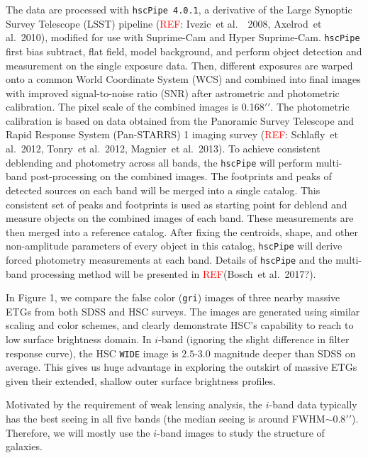 \documentclass[preprint]{aastex}
\def\arcsec{{\prime\prime}}
\def\etal{{\ et al.~}}
\newcommand{\addref}{{\textcolor{red}{REF}}}
\begin{document}
\begin{CJK*}{UTF8}{gbsn}
    The data are processed with \texttt{hscPipe 4.0.1}, a derivative of the Large Synoptic
    Survey Telescope (LSST) pipeline (\addref: Ivezic\etal~2008, Axelrod\etal 2010),
    modified for use with Suprime-Cam and Hyper Suprime-Cam.  
    \texttt{hscPipe} first bias subtract, flat field, model background, and perform object
    detection and measurement on the single exposure data. 
    Then, different exposures are warped onto a common World Coordinate System (WCS) and
    combined into final images with improved signal-to-noise ratio (SNR) after astrometric
    and photometric calibration.  
    The pixel scale of the combined images is 0.168$\arcsec$.  The photometric calibration
    is based on data obtained from the Panoramic Survey Telescope and Rapid Response
    System (Pan-STARRS) 1 imaging survey (\addref: Schlafly\etal 2012, Tonry\etal 2012,
    Magnier\etal 2013). 
    To achieve consistent deblending and photometry across all bands, the \texttt{hscPipe}
    will perform multi-band post-processing on the combined images.  
    The footprints and peaks of detected sources on each band will be merged into a single
    catalog.    
    This consistent set of peaks and footprints is used as starting point for deblend and
    measure objects on the combined images of each band.  
    These measurements are then merged into a reference catalog.  After fixing the
    centroids, shape, and other non-amplitude parameters of every object in this catalog,
    \texttt{hscPipe} will derive forced photometry measurements at each band. 
    Details of \texttt{hscPipe} and the multi-band processing method will be presented in
    \addref (Bosch\etal 2017?).     
          
    In Figure 1, we compare the false color ({\tt gri}) images of three nearby massive
    ETGs from both SDSS and HSC surveys.  
    The images are generated using similar scaling and color schemes, and clearly
    demonstrate HSC's capability to reach to low surface brightness domain.  
    In $i$-band (ignoring the slight difference in filter response curve), the HSC
    \texttt{WIDE} image is $2.5$-$3.0$ magnitude deeper than SDSS on average.  
    This gives us huge advantage in exploring the outskirt of massive ETGs given their
    extended, shallow outer surface brightness profiles. 
    
    Motivated by the requirement of weak lensing analysis, the $i$-band data typically has
    the best seeing in all five bands (the median seeing is around FWHM$\sim 0.8\arcsec$).
    Therefore, we will mostly use the $i$-band images to study the structure of galaxies. 
    

\end{CJK*}
\end{document}
